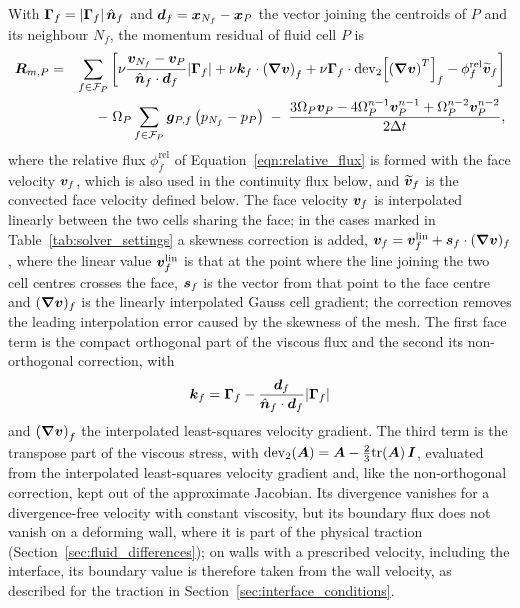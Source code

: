 With $\boldsymbol{\Gamma}_f = |\boldsymbol{\Gamma}_f|\, \hat{\boldsymbol{n}}_f$ and $\boldsymbol{d}_f = \boldsymbol{x}_{N_f} - \boldsymbol{x}_P$ the vector joining the centroids of $P$ and its neighbour $N_f$, the momentum residual of fluid cell $P$ is
\begin{eqnarray}
    \boldsymbol{R}_{m,P}
    &=&
    \sum_{f \in \mathcal{F}_P}
    \bigg[
       \nu
       \frac{\boldsymbol{v}_{N_f} - \boldsymbol{v}_{P}}
            {\hat{\boldsymbol{n}}_f \cdot \boldsymbol{d}_f}
       |\boldsymbol{\Gamma}_f|
       +
       \nu \boldsymbol{k}_f \cdot
       \left( \boldsymbol{\nabla} \boldsymbol{v} \right)_f
       +
       \nu \boldsymbol{\Gamma}_f \cdot
       \mathrm{dev}_2\!\left[ \left( \boldsymbol{\nabla} \boldsymbol{v} \right)^{T} \right]_f
       -
       \phi^\mathrm{rel}_f
       \widetilde{\boldsymbol{v}}_f
    \bigg]
    \notag \\
    &&-\;
    \Omega_P \sum_{f \in \mathcal{F}_P} \boldsymbol{g}_{P,f} \left( p_{N_f} - p_{P} \right)
    \;-\;
    \frac{
    3 \Omega_{P} \boldsymbol{v}_{P}
    -
    4 \Omega_{P}^{n-1} \boldsymbol{v}_{P}^{n-1}
    +
    \Omega_{P}^{n-2} \boldsymbol{v}_{P}^{n-2}
    }
    {2\Delta t},
    \label{eqn:fluid_momentum_residual}
\end{eqnarray}
where the relative flux $\phi^\mathrm{rel}_f$ of Equation~\eqref{eqn:relative_flux} is formed with the face velocity $\boldsymbol{v}_f$, which is also used in the continuity flux below, and $\widetilde{\boldsymbol{v}}_f$ is the convected face velocity defined below.
The face velocity $\boldsymbol{v}_f$ is interpolated linearly between the two cells sharing the face; in the cases marked in Table~\ref{tab:solver_settings} a skewness correction is added, $\boldsymbol{v}_f = \boldsymbol{v}_f^{\mathrm{lin}} + \boldsymbol{s}_f \cdot (\boldsymbol{\nabla}\boldsymbol{v})_f$, where the linear value $\boldsymbol{v}_f^{\mathrm{lin}}$ is that at the point where the line joining the two cell centres crosses the face, $\boldsymbol{s}_f$ is the vector from that point to the face centre and $(\boldsymbol{\nabla}\boldsymbol{v})_f$ is the linearly interpolated Gauss cell gradient; the correction removes the leading interpolation error caused by the skewness of the mesh.
The first face term is the compact orthogonal part of the viscous flux and the second its non-orthogonal correction, with
\begin{equation}
    \boldsymbol{k}_f
    =
    \boldsymbol{\Gamma}_f
    -
    \frac{\boldsymbol{d}_f}
         {\hat{\boldsymbol{n}}_f \cdot \boldsymbol{d}_f}
    |\boldsymbol{\Gamma}_f|
    \label{eqn:non_orthogonal_correction_vector}
\end{equation}
and $\left( \boldsymbol{\nabla} \boldsymbol{v} \right)_f$ the interpolated least-squares velocity gradient.
The third term is the transpose part of the viscous stress, with $\mathrm{dev}_2(\boldsymbol{A}) = \boldsymbol{A} - \tfrac{2}{3}\mathrm{tr}(\boldsymbol{A})\,\boldsymbol{I}$, evaluated from the interpolated least-squares velocity gradient and, like the non-orthogonal correction, kept out of the approximate Jacobian.
Its divergence vanishes for a divergence-free velocity with constant viscosity, but its boundary flux does not vanish on a deforming wall, where it is part of the physical traction (Section~\ref{sec:fluid_differences}); on walls with a prescribed velocity, including the interface, its boundary value is therefore taken from the wall velocity, as described for the traction in Section~\ref{sec:interface_conditions}.

